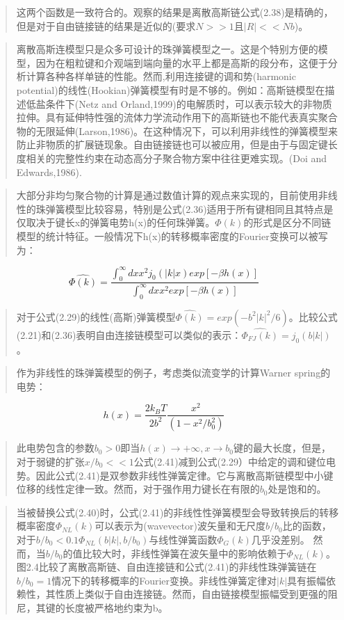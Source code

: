 \begin{quotation}
这两个函数是一致符合的。观察的结果是离散高斯链公式(2.38)是精确的，但是对于自由链接链的结果是近似的(要求$N>>1$且$|R|<<Nb$)。
\end{quotation}
\begin{quotation}
离散高斯连模型只是众多可设计的珠弹簧模型之一。这是个特别方便的模型，因为在粗粒键和介观端到端向量的水平上都是高斯的段分布，这便于分析计算各种各样单链的性能。然而,利用连接键的调和势(harmonic potential)的线性(Hookian)弹簧模型有时是不够的。例如：高斯链模型在描述低盐条件下(Netz and Orland,1999)的电解质时，可以表示较大的非物质拉伸。具有延伸特性强的流体力学流动作用下的高斯链也不能代表真实聚合物的无限延伸(Larson,1986)。在这种情况下，可以利用非线性的弹簧模型来防止非物质的扩展链现象。自由链接链也可以被应用，但是由于与固定键长度相关的完整性约束在动态高分子聚合物方案中往往更难实现。(Doi and Edwards,1986).
\end{quotation}
\begin{quotation}
大部分非均匀聚合物的计算是通过数值计算的观点来实现的，目前使用非线性的珠弹簧模型比较容易，特别是公式(2.36)适用于所有键相同且其特点是仅取决于键长x的弹簧电势h(x)的任何珠弹簧。$\varPhi(k)$的形式是区分不同链模型的统计特征。一般情况下h(x)的转移概率密度的Fourier变换可以被写为：
\end{quotation}
\begin{equation}
\hat{\varPhi(k)}=\frac{\int_{0}^{\infty} dx x^2j_{0}(|k|x)exp[-\beta h(x)]}{\int_{0}^{\infty} dx x^2exp[-\beta h(x)]} 
\end{equation}
\begin{quotation}
对于公式(2.29)的线性(高斯)弹簧模型$\hat{\varPhi(k)}=exp(-b^2|k|^2/6)$。比较公式(2.21)和(2.36)表明自由连接链模型可以类似的表示：$\hat{\varPhi_{FJ}(k)}=j_{0}(b|k|)$。
\end{quotation}
\begin{quotation}
作为非线性的珠弹簧模型的例子，考虑类似流变学的计算Warner spring的电势：
\end{quotation}
\begin{equation}
h(x)=\frac{2k_{B}T}{2b^2}\frac{x^2}{(1-x^2/b_{0}^2)}
\end{equation}
\begin{quotation}
此电势包含的参数$b_{0}>0$即当$h(x)\to +\infty,x\to b_{0}$键的最大长度，但是，对于弱键的扩张$x/b_{0}<<1$公式(2.41)减到公式(2.29）中给定的调和键位电势。因此公式(2.41)是双参数非线性弹簧定律。它与离散高斯链模型中小键位移的线性定律一致。然而，对于强作用力键长在有限的$b_{0}$处是饱和的。
\end{quotation}
\begin{quotation}
当被替换公式(2.40)时，公式(2.41)的非线性性弹簧模型会导致转换后的转移概率密度$\varPhi_{NL}(k)$可以表示为(wavevector)波矢量和无尺度$b/b_{0}$比的函数，对于$b/b_{0}<0.1 \varPhi_{NL}(b|k|,b/b_{0})$与线性弹簧函数$\varPhi_{G}(k)$几乎没差别。 然而，当$b/b_{0}$的值比较大时，非线性弹簧在波矢量中的影响依赖于$\varPhi_{NL}(k)$。图2.4比较了离散高斯链、自由连接链和公式(2.41)的非线性珠弹簧链在$b/b_{0}=1$情况下的转移概率的Fourier变换。非线性弹簧定律对$|k|$具有振幅依赖性，其性质上类似于自由连接链。然而，自由链接模型振幅受到更强的阻尼，其键的长度被严格地约束为b。
\end{quotation}
